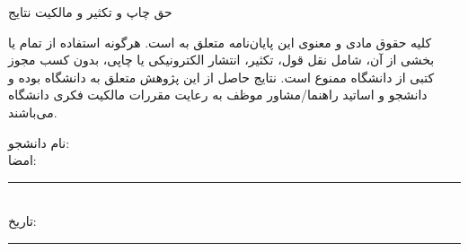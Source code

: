 \thispagestyle{empty}
\begin{center}
  {\XTitr\large حق چاپ و تکثیر و مالکیت نتایج}
\end{center}
\vspace{1.5em}

\noindent
کلیه حقوق مادی و معنوی این پایان‌نامه متعلق به \textbf{\UniversityFA} است.
هرگونه استفاده از تمام یا بخشی از آن، شامل نقل قول، تکثیر، انتشار الکترونیکی
یا چاپی، بدون کسب مجوز کتبی از دانشگاه ممنوع است. نتایج حاصل از این پژوهش
متعلق به دانشگاه بوده و دانشجو و اساتید راهنما/مشاور موظف به رعایت مقررات
مالکیت فکری دانشگاه می‌باشند.

\vspace{2em}
\begin{flushleft}
  نام دانشجو: \StudentNameFA\\[0.8em]
  امضا: \rule{5cm}{0.4pt}\\[1.2em]
  تاریخ: \rule{5cm}{0.4pt}
\end{flushleft}
\clearpage
